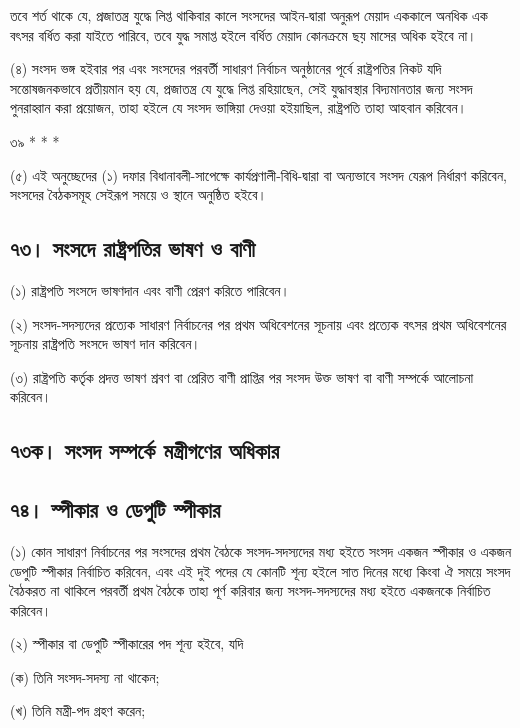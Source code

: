 \documentclass[11pt]{article}
\begin{document}
তবে শর্ত থাকে যে, প্রজাতন্ত্র যুদ্ধে লিপ্ত থাকিবার কালে সংসদের আইন-দ্বারা অনুরূপ
মেয়াদ এককালে অনধিক এক বৎসর বর্ধিত করা যাইতে পারিবে, তবে যুদ্ধ সমাপ্ত হইলে
বর্ধিত মেয়াদ কোনক্রমে ছয় মাসের অধিক হইবে না।

(৪) সংসদ ভঙ্গ হইবার পর এবং সংসদের পরবর্তী সাধারণ নির্বাচন অনুষ্ঠানের পূর্বে
    রাষ্ট্রপতির নিকট যদি সন্তোষজনকভাবে প্রতীয়মান হয় যে, প্রজাতন্ত্র যে যুদ্ধে লিপ্ত
    রহিয়াছেন, সেই যুদ্ধাবস্থার বিদ্যমানতার জন্য সংসদ পুনরাহ্বান করা প্রয়োজন, তাহা
    হইলে যে সংসদ ভাঙ্গিয়া দেওয়া হইয়াছিল, রাষ্ট্রপতি তাহা আহবান করিবেন।

৩৯ * * *

(৫) এই অনুচ্ছেদের (১) দফার বিধানাবলী-সাপেক্ষে কার্যপ্রণালী-বিধি-দ্বারা বা
    অন্যভাবে সংসদ যেরূপ নির্ধারণ করিবেন, সংসদের বৈঠকসমূহ সেইরূপ সময়ে ও স্থানে
    অনুষ্ঠিত হইবে।

\subsection{৭৩। সংসদে রাষ্ট্রপতির ভাষণ ও বাণী}
\label{sec:org824135a}
(১) রাষ্ট্রপতি সংসদে ভাষণদান এবং বাণী প্রেরণ করিতে পারিবেন।

(২) সংসদ-সদস্যদের প্রত্যেক সাধারণ নির্বাচনের পর প্রথম অধিবেশনের সূচনায় এবং
    প্রত্যেক বৎসর প্রথম অধিবেশনের সূচনায় রাষ্ট্রপতি সংসদে ভাষণ দান করিবেন।

(৩) রাষ্ট্রপতি কর্তৃক প্রদত্ত ভাষণ শ্রবণ বা প্রেরিত বাণী প্রাপ্তির পর সংসদ উক্ত
    ভাষণ বা বাণী সম্পর্কে আলোচনা করিবেন।

\subsection{৭৩ক। সংসদ সম্পর্কে মন্ত্রীগণের অধিকার}
\label{sec:orgdbb38bf}


\subsection{৭৪। স্পীকার ও ডেপুটি স্পীকার}
\label{sec:orgeea0dc2}
(১) কোন সাধারণ নির্বাচনের পর সংসদের প্রথম বৈঠকে সংসদ-সদস্যদের মধ্য হইতে
    সংসদ একজন স্পীকার ও একজন ডেপুটি স্পীকার নির্বাচিত করিবেন, এবং এই দুই পদের
    যে কোনটি শূন্য হইলে সাত দিনের মধ্যে কিংবা ঐ সময়ে সংসদ বৈঠকরত না থাকিলে
    পরবর্তী প্রথম বৈঠকে তাহা পূর্ণ করিবার জন্য সংসদ-সদস্যদের মধ্য হইতে একজনকে
    নির্বাচিত করিবেন।

(২) স্পীকার বা ডেপুটি স্পীকারের পদ শূন্য হইবে, যদি

(ক) তিনি সংসদ-সদস্য না থাকেন;

(খ) তিনি মন্ত্রী-পদ গ্রহণ করেন;
\end{document}
